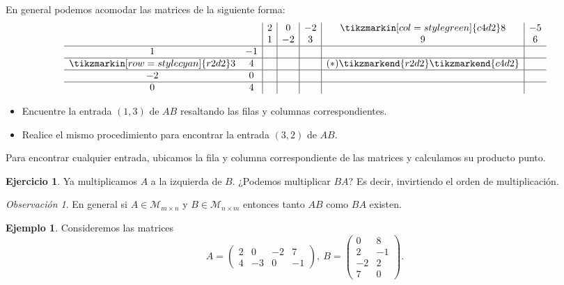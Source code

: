 \documentclass[12pt]{article}
\theoremstyle{plain}
\theoremstyle{definition}
\newtheorem{Ex}[Th]{Ejemplo}           %
\newtheorem{Ej}[Th]{Ejercicio}         %
\theoremstyle{remark}
\newtheorem*{Rmk}{Observación}      %
\newcommand{\cM}{\mathcal{M}}       %
\newcommand{\x}{\times}             %
\renewcommand{\:}{\colon}           %
\renewcommand{\.}{\Cdot}                %
\begin{document}
\begin{multicols}{2}
En general podemos acomodar las matrices de la siguiente forma:
$$
\begin{array}{cc|c|c|c|c|c}
    &&2&0&-2&\tikzmarkin[col = style green]{c4d2}8&-5\\
    &&1&-2&3&9&6\\
    \hline1&-1&&&&&\\
    \hline\tikzmarkin[row = style cyan]{r2d2}3&4&&&&(\ast)\tikzmarkend{r2d2}\tikzmarkend{c4d2}&\\
\hline-2&0&&&&&\\
   \hline 0&4&&&&&\\
\end{array}
$$

\begin{ptcbP}
  \begin{itemize}
    \item Encuentre la entrada $(1,3)$ de $AB$ resaltando las filas y columnas correspondientes.
    \item Realice el mismo procedimiento para encontrar la entrada $(3,2)$ de $AB$.
  \end{itemize}
  \end{ptcbP}
Para encontrar cualquier entrada, ubicamos la fila y columna correspondiente de las matrices y calculamos su producto punto.



\begin{Ej}
Ya multiplicamos $A$ a la izquierda de $B$. ¿Podemos multiplicar $BA$? Es decir, invirtiendo el orden de multiplicación.
\end{Ej}

\begin{Rmk}
En general si $A\in\cM_{m\x n}$ y $B\in\cM_{n\x m}$ entonces tanto $AB$ como $BA$ existen.
\end{Rmk}

\begin{Ex}
  Consideremos las matrices
$$A=\begin{pmatrix}
    2&0&-2&7\\
    4&-3&0&-1
\end{pmatrix},\ B=\begin{pmatrix}
    0&8\\
    2&-1\\
    -2&2\\
    7&0
\end{pmatrix}.$$ 


\end{Ex}
\end{multicols}
\end{document}
